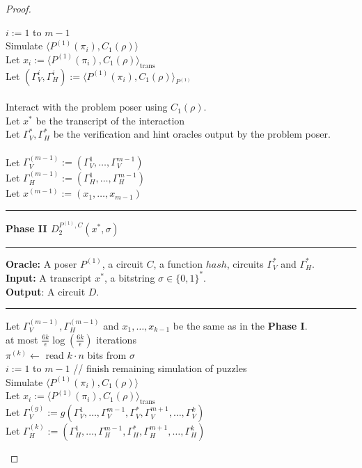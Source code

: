 \begin{proof}
\begin{codeblock}
  \For $i:=1$ to $m-1$ \Do \\
  \IndI Simulate $\langle P^{(1)}(\pi_i), C_1(\rho)\rangle$ \\
  \IndI Let $ x_i := \langle P^{(1)}(\pi_i), C_1(\rho)\rangle_{\text{trans}}$ \\
  \IndI Let $(\Gamma_V^i, \Gamma_H^i) := \langle P^{(1)}(\pi_i), C_1(\rho) \rangle_{P^{(1)}}$ \\ \\
  Interact with the problem poser using $C_1(\rho)$. \\
  \IndI Let $x^*$ be the transcript of the interaction \\
  \IndI Let $\Gamma_V^*, \Gamma_H^*$ be the verification and hint oracles output by the problem poser. \\
  \\
  Let $\Gamma_V^{(m-1)} := (\Gamma_V^{1}, \dots, \Gamma_V^{m-1})$ \\
  Let $\Gamma_H^{(m-1)} := (\Gamma_H^{1}, \dots, \Gamma_H^{m-1})$ \\
  Let $x^{(m-1)} := (x_1, \dots, x_{m-1})$ \\
  \medskip \hrule \medskip
  \textbf{Phase II $D_2^{P^{(1)}, C}(x^*, \sigma)$}
  \medskip \hrule \medskip
  \textbf{Oracle:} A poser $P^{(1)}$, a circuit $C$, a function $hash$, circuits $\Gamma_V^{*}$ and $\Gamma_H^{*}$. \\
  \textbf{Input:} A transcript $x^*$, a bitstring $\sigma \in \{0,1\}^{*}$.\\
  \textbf{Output}: A circuit $D$.
  \medskip \hrule \medskip
  Let $\Gamma_V^{(m-1)}, \Gamma_H^{(m-1)}$ and $x_1, \dots, x_{k-1}$ be the same as in the \textbf{Phase I}.\\
  \For at most $\frac{6k}{\epsilon} \log(\frac{6k}{\epsilon})$ iterations \Do \\
  \IndI $\pi^{(k)} \leftarrow$ read $k\cdot n$ bits from $\sigma$ \\
  \IndI \For $i:=1$ to $m-1$ \Do \IndII // finish remaining simulation of puzzles\\
  \IndII Simulate $\langle P^{(1)}(\pi_i), C_1(\rho)\rangle$ \\
  \IndII Let $ x_i := \langle P^{(1)}(\pi_i), C_1(\rho)\rangle_{\text{trans}}$ \\
  \IndI Let $\Gamma_V^{(g)} := g(\Gamma_V^{1}, \dots, \Gamma_V^{m-1}, \Gamma_V^{*}, \Gamma_V^{m+1}, \dots, \Gamma_V^{k})$  \\
  \IndI Let $\Gamma_H^{(k)} := (\Gamma_H^{1}, \dots, \Gamma_H^{m-1}, \Gamma_H^{*}, \Gamma_H^{m+1}, \dots, \Gamma_H^{k})$ \\

\end{codeblock}
\end{proof}
